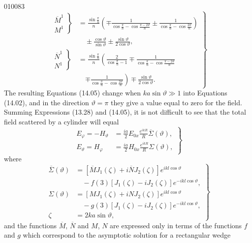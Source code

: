 \begin{scanpage}{0100}{83}
\[
\left.\begin{aligned}
\left.\begin{matrix}\overline M^1\\M^1\end{matrix}\right\}
&=\frac{\sin\frac\pi n}n\left(\mp\frac1{\cos\frac\pi n-\cos\frac{\pi-2\vartheta}n}\pm\frac1{\cos\frac\pi n-\cos\frac{2\vartheta}n}\right)\\
&\quad\pm\frac{\cos\vartheta}{\sin\vartheta}\pm\frac{\sin\vartheta}{2\cos\vartheta},\\
\left.\begin{matrix}\overline N^1\\N^1\end{matrix}\right\}
&=\frac{\sin\frac\pi n}n\left(\frac2{\cos\frac\pi n-1}\mp\frac1{\cos\frac\pi n-\cos\frac{\pi-2\vartheta}n}\right.\\
&\quad\left.\mp\frac1{\cos\frac\pi n-\cos\frac{2\vartheta}n}\right)\mp\frac{\sin\vartheta}{2\cos\vartheta}.
\end{aligned}\right\}\tag{14.08}
\]
The resulting Equations (14.05) change when $ka\sin\vartheta\gg1$ into Equations (14.02), and in the direction $\vartheta=\pi$ they give a value equal to zero for the field.
Summing Expressions (13.28) and (14.05), it is not difficult to see that the total field scattered by a cylinder will equal
\[\left.\begin{aligned}E_\varphi=-H_\vartheta&=\frac{ia}2E_{0x}\frac{e^{ikR}}R\overline\Sigma(\vartheta),\\E_\vartheta=H_\varphi&=\frac{ia}2H_{0x}\frac{e^{ikR}}R\Sigma(\vartheta),\end{aligned}\right\}\tag{15.01}\]
where
\[\left.\begin{aligned}\overline\Sigma(\vartheta)&=[\overline M J_1(\zeta)+i\overline N J_2(\zeta)]e^{ikl\cos\vartheta}\\&\quad-f(3)[J_1(\zeta)-iJ_2(\zeta)]e^{-ikl\cos\vartheta},\\\Sigma(\vartheta)&=[M J_1(\zeta)+iN J_2(\zeta)]e^{ikl\cos\vartheta}\\&\quad-g(3)[J_1(\zeta)-iJ_2(\zeta)]e^{-ikl\cos\vartheta},\\\zeta&=2ka\sin\vartheta,
\end{aligned}\right\}\tag{15.02}\]
and the functions $\overline M$, $\overline N$ and $M$, $N$ are expressed only in terms of the functions $f$ and $g$ which correspond to the asymptotic solution for a rectangular wedge
\end{scanpage}
